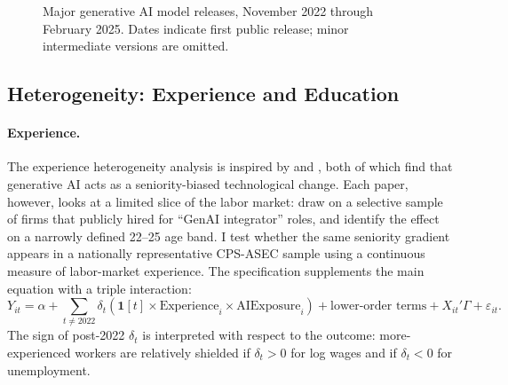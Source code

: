 \documentclass[11pt]{article}
\theoremstyle{plain}
\theoremstyle{remark}
\begin{document}
\begin{figure}[htbp]
\centering
{}
\caption{Major generative AI model releases, November 2022 through February 2025.  Dates indicate first public release; minor intermediate versions are omitted.}
\label{fig:model_timeline}
\end{figure}

\subsection{Heterogeneity: Experience and Education}

\paragraph{Experience.} The experience heterogeneity analysis is inspired by \textcite{hosseini2025seniority} and \textcite{brynjolfsson2025canaries}, both of which find that generative AI acts as a seniority-biased technological change. Each paper, however, looks at a limited slice of the labor market: \textcite{hosseini2025seniority} draw on a selective sample of firms that publicly hired for ``GenAI integrator'' roles, and \textcite{brynjolfsson2025canaries} identify the effect on a narrowly defined 22--25 age band. I test whether the same seniority gradient appears in a nationally representative CPS-ASEC sample using a continuous measure of labor-market experience. The specification supplements the main equation with a triple interaction:
\begin{equation}
\label{eq:triple}
Y_{it} = \alpha
  + \sum_{t \neq 2022} \delta_t \left( \mathbf{1}[t] \times \text{Experience}_i \times \text{AIExposure}_i \right)
  + \text{lower-order terms} + X_{it}'\Gamma + \varepsilon_{it}.
\end{equation}
The sign of post-2022 $\delta_t$ is interpreted with respect to the outcome: more-experienced workers are relatively shielded if $\delta_t > 0$ for log wages and if $\delta_t < 0$ for unemployment.
\end{document}
